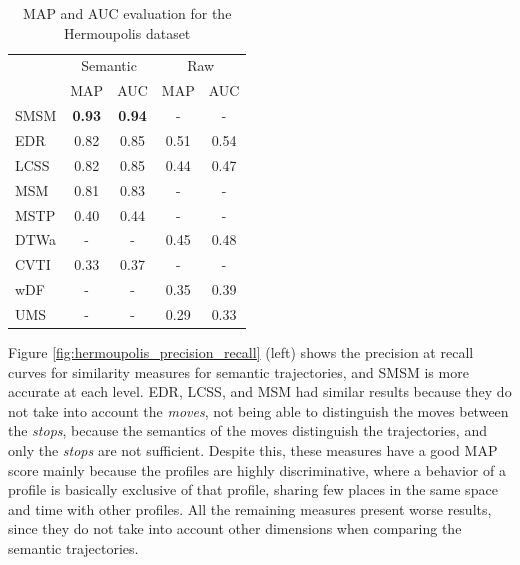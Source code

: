\documentclass[12pt]{article}
\begin{document}
\begin{table}[h]
\scriptsize
  \centering
  \begin{tabular}{|l|c|c|c|c|}
  	\hline
 & \multicolumn{2}{c}{Semantic} & \multicolumn{2}{|c|}{Raw} \\
 	\cline{2-5}
 & MAP & AUC & MAP & AUC \\
  	\hline
SMSM & \textbf{0.93} & \textbf{0.94} & - & -\\
EDR & 0.82 & 0.85 & 0.51 & 0.54 \\
LCSS & 0.82 & 0.85 & 0.44 & 0.47 \\
MSM & 0.81 & 0.83 & - & - \\
MSTP & 0.40 & 0.44 & - & - \\
DTWa & - & - & 0.45 & 0.48 \\
CVTI & 0.33 & 0.37 & - & - \\
wDF & - & - & 0.35 & 0.39 \\
UMS & - & - & 0.29 & 0.33 \\
    \hline
  \end{tabular}
  \caption{MAP and AUC evaluation for the Hermoupolis dataset}
  \label{tab:hermoupolis_measures_map_auc}
\end{table}

Figure \ref{fig:hermoupolis_precision_recall} (left) shows the precision at recall curves for similarity measures for semantic trajectories, and SMSM is more accurate at each level. EDR, LCSS, and MSM had similar results because they do not take into account the \emph{moves}, not being able to distinguish the moves between the \emph{stops}, because the semantics of the moves distinguish the trajectories, and only the \emph{stops} are not sufficient. Despite this, these measures have a good MAP score mainly because the profiles are highly discriminative, where a behavior of a profile is basically exclusive of that profile, sharing few places in the same space and time with other profiles. All the remaining measures present worse results, since they do not take into account other dimensions when comparing the semantic trajectories.
\end{document}
